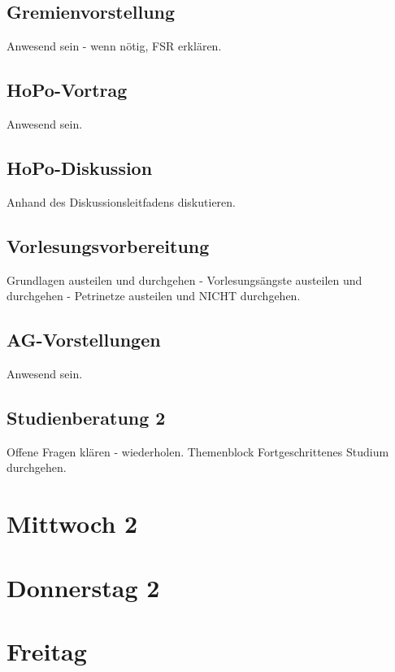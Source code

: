 \documentclass[10pt,a4paper,oneside,ngerman,numbers=noenddot]{scrartcl}
\begin{document}
	\subsection{Gremienvorstellung}
		Anwesend sein - wenn nötig, FSR erklären.
	\subsection{HoPo-Vortrag}
		Anwesend sein.
	\subsection{HoPo-Diskussion}
		Anhand des Diskussionsleitfadens diskutieren.
	\subsection{Vorlesungsvorbereitung}
		Grundlagen austeilen und durchgehen - Vorlesungsängste austeilen und durchgehen - Petrinetze austeilen und NICHT durchgehen.
	\subsection{AG-Vorstellungen}
		Anwesend sein.
	\subsection{Studienberatung 2}
		Offene Fragen klären - wiederholen. Themenblock Fortgeschrittenes Studium durchgehen.
	
\section{Mittwoch 2}

\section{Donnerstag 2}

\section{Freitag}
\end{document}
